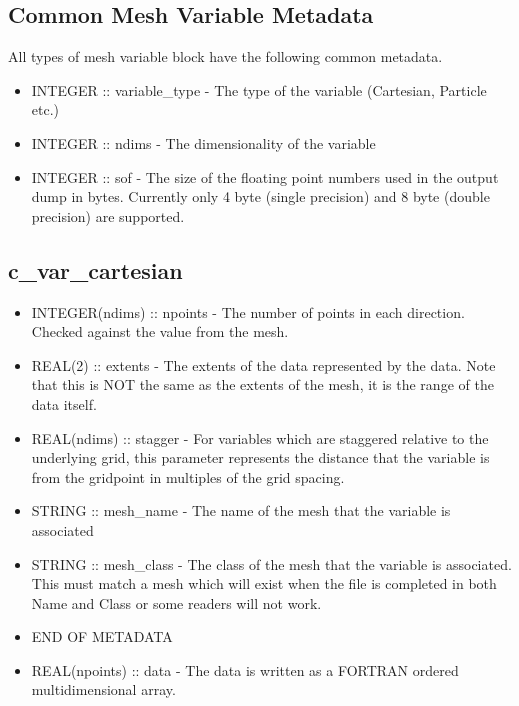 \documentclass[8pt]{article} \usepackage{url,graphicx,tabularx,array}
\begin{document}
\subsection{Common Mesh Variable Metadata}
All types of mesh variable block have the following common metadata.
\begin{itemize}
\item INTEGER :: variable\_type - The type of the variable (Cartesian, Particle
  etc.)
\item INTEGER :: ndims - The dimensionality of the variable
\item INTEGER :: sof - The size of the floating point numbers used in the
  output dump in bytes. Currently only 4 byte (single precision) and 8 byte
  (double precision) are supported.
\end{itemize}

\subsection{c\_var\_cartesian}
\begin{itemize}
\item INTEGER(ndims) :: npoints - The number of points in each
  direction. Checked against the value from the mesh.
\item REAL(2) :: extents - The extents of the data represented by the
  data. Note that this is NOT the same as the extents of the mesh, it is the
  range of the data itself.
\item REAL(ndims) :: stagger - For variables which are staggered relative to
  the underlying grid, this parameter represents the distance that the variable
  is from the gridpoint in multiples of the grid spacing.
\item STRING :: mesh\_name - The name of the mesh that the variable is
  associated
\item STRING :: mesh\_class - The class of the mesh that the variable is
  associated. This must match a mesh which will exist when the file is
  completed in both Name and Class or some readers will not work.
\item END OF METADATA
\item REAL(npoints) :: data - The data is written as a FORTRAN ordered
  multidimensional array.
\end{itemize}
\end{document}

